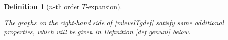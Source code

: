 \documentclass{article}
\newcommand{\1}{\mathds{1}}
\numberwithin{equation}{section}
\newcommand{\al}{\alpha}
\renewcommand{\cal}{\mathcal}
\renewcommand{\leq}{\leqslant}
\renewcommand{\le}{\leq}
\newcommand{\E}{\mathbb{E}}
\theoremstyle{plain} %
\newtheorem{definition}[theorem]{Definition}
\theoremstyle{remark}
\newtheorem{remark}[theorem]{Remark}
\newcommand{\cor}{\color{red}}
\newcommand{\PT}{\mathcal R_T}
\newcommand{\PTn}{\mathcal R_T^{(n)}}
\newcommand{\PTk}{{\mathcal R_{T,k}}}
\newcommand{\QTn}{\mathcal Q_T^{(n)}}
\newcommand{\QTk}{{\mathcal Q_{T,k}}}
\newcommand{\ATn}{\mathcal A_T^{(>n)}}
\begin{document}
\begin{definition} [$n$-th order $T$-expansion]
\begin{enumerate}
%
 
\end{enumerate}
The graphs on the right-hand side of \eqref{mlevelTgdef} satisfy some additional properties, which will be given in Definition \ref{def genuni} below. %
\end{definition}




\end{document}
